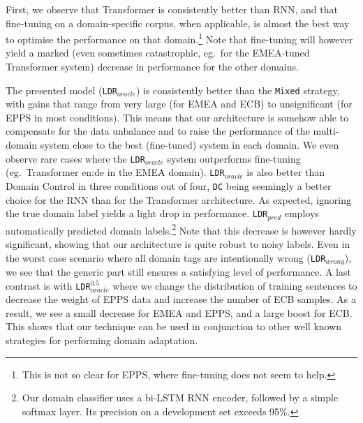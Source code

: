 \documentclass[a4paper]{article}
\newcommand{\fyTodo}[1]{\Todo[FY:]{\textcolor{orange}{#1}}}
\newcommand{\fyDone}[1]{\done[FY]\Todo[FY:]{\textcolor{orange}{#1}}}
\begin{document}
First, we observe that Transformer is consistently better than RNN, and that fine-tuning on a domain-specific corpus, when applicable, is almost the best way to optimise the performance on that domain.\footnote{This is not so clear for EPPS, where fine-tuning does not seem to help.}  
Note that fine-tuning will however yield a marked (even sometimes catastrophic, eg.\ for the EMEA-tuned Transformer system) decrease in performance for the other domains. 

The presented model (\texttt{LDR}$_{oracle}$) is consistently better than the \texttt{Mixed} strategy, with gains that range from very large (for EMEA and ECB) to unsignificant (for EPPS in most conditions). 
This means that our architecture is somehow able to compensate for the data unbalance and to raise the performance of the multi-domain system close to the best (fine-tuned) system in each domain. 
We even observe rare cases where the \texttt{LDR}$_{oracle}$ system outperforms fine-tuning (eg.\ Transformer en:de in the EMEA domain). 
\texttt{LDR}$_{oracle}$ is also better than Domain Control in three conditions out of four, \texttt{DC} being seemingly a better choice for the RNN than for the Transformer architecture. 
As expected, ignoring the true domain label yields a light drop in performance. %
\texttt{LDR}$_{pred}$ employs automatically predicted domain labels.\footnote{Our domain classifier uses a bi-LSTM RNN encoder, followed by a simple softmax layer. 
Its precision on a development set exceeds 95\%.}
Note that this decrease is however hardly significant, showing that our architecture is quite robust to noisy labels. 
Even in the worst case scenario where all domain tags are intentionally wrong (\texttt{LDR}$_{wrong}$), we see that the generic part still ensures a satisfying level of performance. 
A last contrast is with \texttt{LDR}$_{oracle}^{0.5}$ where we change the distribution of training sentences to decrease the weight of EPPS data and increase the number of ECB samples. 
As a result, we see a small decrease for EMEA and EPPS, and a large boost for ECB. 
This shows that our technique can be used in conjunction to other well known strategies for performing domain adaptation. 


\end{document}
